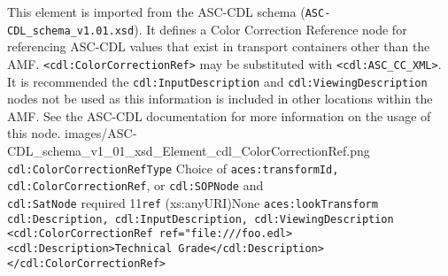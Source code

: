         {This element is imported from the ASC-CDL schema (\texttt{ASC-CDL\_schema\_v1.01.xsd}).  It defines a Color Correction Reference node for referencing ASC-CDL values that exist in transport containers other than the AMF.  \texttt{<cdl:ColorCorrectionRef>} may be substituted with \texttt{<cdl:ASC\_CC\_XML>}.  It is recommended the \texttt{cdl:InputDescription} and \texttt{cdl:ViewingDescription} nodes not be used as this information is included in other locations within the AMF.  See the ASC-CDL documentation for more information on the usage of this node.}
        {images/ASC-CDL_schema_v1_01_xsd_Element_cdl_ColorCorrectionRef.png}
        {\texttt{cdl:ColorCorrectionRefType}}
        {Choice of \texttt{aces:transformId, cdl:ColorCorrectionRef}, or \texttt{cdl:SOPNode} and \\ \texttt{cdl:SatNode} required}
        {1}{1}{\texttt{ref} (xs:anyURI)}{None}
        {\texttt{aces:lookTransform}}
        {\texttt{cdl:Description, cdl:InputDescription, cdl:ViewingDescription}}
        {\lstinline{<cdl:ColorCorrectionRef ref="file:///foo.edl>}\\
                    \lstinline{<cdl:Description>Technical Grade</cdl:Description>}\\
                    \lstinline{</cdl:ColorCorrectionRef>}}
